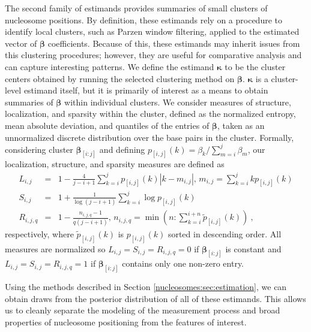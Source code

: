 The second family of estimands provides summaries of small clusters of nucleosome positions.
By definition, these estimands rely on a procedure to identify local clusters, such as Parzen window filtering, applied to the estimated vector of $\bm \beta$ coefficients.
Because of this, these estimands may inherit issues from this clustering procedures; however, they are useful for comparative analysis and can capture interesting patterns.
We define the estimand $\bm \kappa$ to be the cluster centers obtained by running the selected clustering method on $\bm \beta$.
$\bm \kappa$ is a cluster-level estimand itself, but it is primarily of interest as a means to obtain summaries of $\bm \beta$ within individual clusters.
We consider
measures of structure, localization, and sparsity within the cluster, defined as the normalized entropy, mean absolute deviation, and quantiles of the entries of $\bm \beta$, taken as an unnormalized discrete distribution over the base pairs in the cluster.
Formally, considering cluster $\bm \beta_{[i:j]}$ and defining $p_{[i,j]}(k) = \beta_k / \sum_{m=i}^{j} \beta_m$, our localization, structure, and sparsity measures are defined as
\begin{eqnarray}
L_{i,j} &=&  1 - \frac{4}{j - i + 1} \sum_{k=i}^{j} p_{[i,j]}(k) |k - m_{i,j}|, \, m_{i,j} = \sum_{k=i}^{j} k p_{[i,j]}(k) \label{nucleosomes:eq:localization} \\
S_{i,j} &=&  1 + \frac{1}{\log(j - i + 1)} \sum_{k=i}^{j} \log p_{[i,j]}(k) \label{nucleosomes:eq:structure} \\
R_{i,j,q} &=& 1 - \frac{n_{i,j,q} - 1}{q (j - i + 1)}, \, n_{i,j,q} = \min\left(n : \sum_{k=i}^{i + n} \tilde{p}_{[i,j]}(k) \right) \label{nucleosomes:eq:sparsity} \ ,
\end{eqnarray}
respectively, where $\tilde{p}_{[i,j]}(k)$ is $p_{[i,j]}(k)$ sorted in descending order.
All measures are normalized so $L_{i,j} = S_{i,j} = R_{i,j,q} = 0$ if $\bm \beta_{[i:j]}$ is constant and $L_{i,j} = S_{i,j} = R_{i,j,q} = 1$ if $\bm \beta_{[i:j]}$ contains only one non-zero entry.

Using the methods described in Section \ref{nucleosomes:sec:estimation}, we can obtain draws from the posterior distribution of all of these estimands.
This allows us to cleanly separate the modeling of the measurement process and broad properties of nucleosome positioning from the features of interest.

